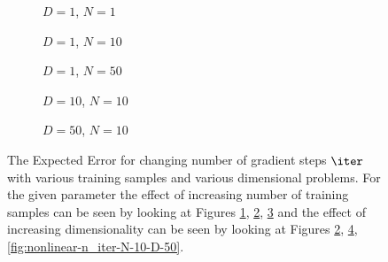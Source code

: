 \begin{figure}[!htb]
  \centering
    \begin{subfigure}{0.3\textwidth}
      \centering
      \caption{$D=1$, $N=1$}
      \label{fig:nonlinear-n_iter-N-1-D-1}
    \end{subfigure}
    \begin{subfigure}{0.3\textwidth}
      \centering
      \caption{$D=1$, $N=10$}
      \label{fig:nonlinear-n_iter-N-10-D-1}
    \end{subfigure}
    \begin{subfigure}{0.3\textwidth}
      \centering
      \caption{$D=1$, $N=50$}
      \label{fig:nonlinear-n_iter-N-50-D-1}
    \end{subfigure}

    \begin{subfigure}{0.3\textwidth}
      \centering
      \caption{$D=10$, $N=10$}
      \label{fig:nonlinear-n_iter-N-10-D-10}
    \end{subfigure}
    \begin{subfigure}{0.3\textwidth}
      \centering
      \caption{$D=50$, $N=10$}
      \label{fig:nonlinear-n_iter-N-100-D-50}
    \end{subfigure}  
  \caption{The Expected Error for changing number of gradient steps $\iter$ with various training samples and various dimensional problems. For the given parameter the effect of increasing number of training samples can be seen by looking at Figures \ref{fig:nonlinear-n_iter-N-1-D-1}, \ref{fig:nonlinear-n_iter-N-10-D-1}, \ref{fig:nonlinear-n_iter-N-50-D-1} and the effect of increasing dimensionality can be seen by looking at Figures \ref{fig:nonlinear-n_iter-N-10-D-1}, \ref{fig:nonlinear-n_iter-N-10-D-10}, \ref{fig:nonlinear-n_iter-N-10-D-50}.}\label{fig:nonlinear-n_iter}
\end{figure}


